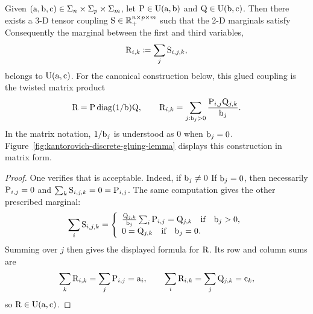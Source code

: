 \begin{lem}\label{lem-gluing-discr}
	Given $(\a,\b,\VectMode{c}) \in \simplex_n \times \simplex_p \times \simplex_m$,
	let $\P \in \CouplingsD(\a,\b)$ and $\Q \in \CouplingsD(\b,\VectMode{c})$. Then there exists a 3-D tensor coupling $\S \in \RR_+^{n \times p \times m}$
	such that the 2-D marginals satisfy
	Consequently the marginal between the first and third variables,
	\[
		\R_{i,k}\eqdef\sum_j \S_{i,j,k},
	\]
	belongs to $\CouplingsD(\a,\VectMode{c})$. For the canonical construction below, this glued coupling is the twisted matrix product
	\[
		\R=\P\diag(1/\b)\Q,
		\qquad
		\R_{i,k}=\sum_{j:\b_j>0}\frac{\P_{i,j}\Q_{j,k}}{\b_j}.
	\]
	In the matrix notation, $1/\b_j$ is understood as $0$ when $\b_j=0$.
	Figure~\ref{fig:kantorovich-discrete-gluing-lemma} displays this construction in matrix form.
\end{lem}
\begin{proof}
	One verifies that
	is acceptable. Indeed, if $\b_j \neq 0$
	If $\b_j = 0$, then necessarily $\P_{i,j}=0$ and $\sum_{k} \S_{i,j,k} = 0 = \P_{i,j}$.
	The same computation gives the other prescribed marginal:
	\[
		\sum_i \S_{i,j,k}
		=
		\choice{
			\frac{\Q_{j,k}}{\b_j}\sum_i\P_{i,j}=\Q_{j,k} \qifq \b_j>0,\\
			0=\Q_{j,k} \qifq \b_j=0.
		}
	\]
	Summing over $j$ then gives the displayed formula for $\R$. Its row and column sums are
	\[
		\sum_k\R_{i,k}=\sum_j\P_{i,j}=\a_i,
		\qquad
		\sum_i\R_{i,k}=\sum_j\Q_{j,k}=\VectMode{c}_k,
	\]
	so $\R\in\CouplingsD(\a,\VectMode{c})$.
\end{proof}

